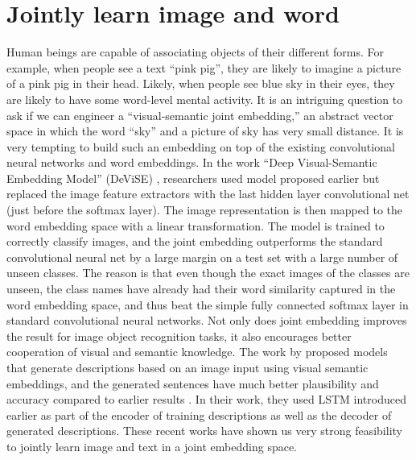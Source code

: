 \section{Jointly learn image and word}
Human beings are capable of associating objects of their different forms. For example, when people see a text ``pink pig'', they are likely to imagine a picture of a pink pig in their head. Likely, when people see blue sky in their eyes, they are likely to have some word-level mental activity. It is an intriguing question to ask if we can engineer a ``visual-semantic joint embedding,'' an abstract vector space in which the word ``sky'' and a picture of sky has very small distance. It is very tempting to build such an embedding on top of the existing convolutional neural networks and word embeddings. In the work ``Deep Visual-Semantic Embedding Model'' (DeViSE) \cite{frome13}, researchers used model proposed earlier \cite{weston10} but replaced the image feature extractors with the last hidden layer convolutional net \cite{krizhevsky12} (just before the softmax layer). The image representation is then mapped to the word embedding space \cite{mikolov13} with a linear transformation. The model is trained to correctly classify images, and the joint embedding outperforms the standard convolutional neural net by a large margin on a test set with a large number of unseen classes. The reason is that even though the exact images of the classes are unseen, the class names have already had their word similarity captured in the word embedding space, and thus beat the simple fully connected softmax layer in standard convolutional neural networks. Not only does joint embedding improves the result for image object recognition tasks, it also encourages better cooperation of visual and semantic knowledge. The work by \cite{kiros14b} proposed models that generate descriptions based on an image input using visual semantic embeddings, and the generated sentences have much better plausibility and accuracy compared to earlier results \cite{kulkarni11,mitchell12}. In their work, they used LSTM introduced earlier as part of the encoder of training descriptions as well as the decoder of generated descriptions. These recent works have shown us very strong feasibility to jointly learn image and text in a joint embedding space.

